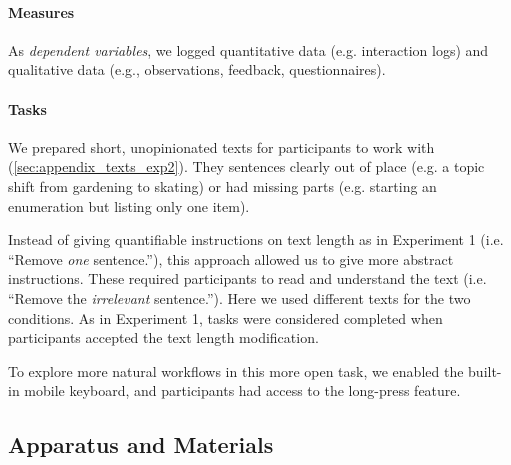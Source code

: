 \paragraph{Measures}
As \textit{dependent variables}, we logged quantitative data (e.g. interaction logs) and qualitative data (e.g., observations, feedback, questionnaires).

\paragraph{Tasks}
We prepared short, unopinionated texts for participants to work with (\cref{sec:appendix_texts_exp2}).
They  sentences clearly out of place (e.g. a topic shift from gardening to skating) or had missing parts (e.g. starting an enumeration but listing only one item).

Instead of giving quantifiable instructions on text length as in Experiment 1 (i.e. ``Remove \textit{one} sentence.''), this approach allowed us to give more abstract instructions. These required participants to read and understand the text (i.e. ``Remove the \textit{irrelevant} sentence.'').
Here we used different texts for the two conditions.
As in Experiment 1, tasks were considered completed when participants accepted the text length modification.

To explore more natural workflows in this more open task, we enabled the built-in mobile keyboard, and participants had access to the long-press feature.





\subsection{Apparatus and Materials}

